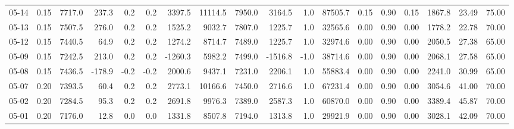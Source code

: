 \begin{threeparttable}
{\begin{tabular}{lrrrrrrrrrrrrrrrrr}
  05-14 &     0.15 & 7717.0 &             237.3 &               0.2 &                0.2 &             3397.5 & 11114.5 & 7950.0 &     3164.5 &                      1.0 &             87505.7 &       0.15 &      0.90 &           0.15 &           1867.8 &           23.49 &                  75.00 \\
  05-13 &     0.15 & 7507.5 &             276.0 &               0.2 &                0.2 &             1525.2 &  9032.7 & 7807.0 &     1225.7 &                      1.0 &             32565.6 &       0.00 &      0.90 &           0.00 &           1778.2 &           22.78 &                  70.00 \\
  05-12 &     0.15 & 7440.5 &              64.9 &               0.2 &                0.2 &             1274.2 &  8714.7 & 7489.0 &     1225.7 &                      1.0 &             32974.6 &       0.00 &      0.90 &           0.00 &           2050.5 &           27.38 &                  65.00 \\
  05-09 &     0.15 & 7242.5 &             213.0 &               0.2 &                0.2 &            -1260.3 &  5982.2 & 7499.0 &    -1516.8 &                     -1.0 &             38714.6 &       0.00 &      0.90 &           0.00 &           2068.1 &           27.58 &                  65.00 \\
  05-08 &     0.15 & 7436.5 &            -178.9 &              -0.2 &               -0.2 &             2000.6 &  9437.1 & 7231.0 &     2206.1 &                      1.0 &             55883.4 &       0.00 &      0.90 &           0.00 &           2241.0 &           30.99 &                  65.00 \\
  05-07 &     0.20 & 7393.5 &              60.4 &               0.2 &                0.2 &             2773.1 & 10166.6 & 7450.0 &     2716.6 &                      1.0 &             67231.4 &       0.00 &      0.90 &           0.00 &           3054.6 &           41.00 &                  70.00 \\
  05-02 &     0.20 & 7284.5 &              95.3 &               0.2 &                0.2 &             2691.8 &  9976.3 & 7389.0 &     2587.3 &                      1.0 &             60870.0 &       0.00 &      0.90 &           0.00 &           3389.4 &           45.87 &                  70.00 \\
  05-01 &     0.20 & 7176.0 &              12.8 &               0.0 &                0.0 &             1331.8 &  8507.8 & 7194.0 &     1313.8 &                      1.0 &             29921.9 &       0.00 &      0.90 &           0.00 &           3028.1 &           42.09 &                  70.00 \\

\end{tabular}}
\end{threeparttable}
